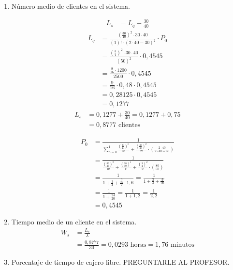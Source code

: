 \documentclass{templateNote}
\begin{document}
\begin{enumerate}
    \item N\'umero medio de clientes en el sistema.
    \newline
    \begin{minipage}[t]{0.45\linewidth}
        \begin{align*}
            L_s &= L_q + \frac{30}{40}
        \end{align*}
        \begin{align*}
            L_q &= \frac{\left(\frac{30}{40}\right)^2 \cdot 30 \cdot 40}{(1)! \cdot (2 \cdot 40 - 30)^2} \cdot P_0 \\
            &= \frac{\left(\frac{3}{4}\right)^2 \cdot 30 \cdot 40}{(50)^2} \cdot 0,4545 \\
            &= \frac{\frac{9}{16} \cdot 1200}{2500} \cdot 0,4545 \\
            &= \frac{9}{16} \cdot 0,48 \cdot 0,4545 \\
            &= 0,28125 \cdot 0,4545 \\
            &= 0,1277
        \end{align*}
        \begin{align*}
            L_s &= 0,1277 + \frac{30}{40} = 0,1277 + 0,75 \\
            &= 0,8777 \text{ clientes}
        \end{align*}

    \end{minipage}
    \hfill
    \begin{minipage}[t]{0.45\textwidth}
        \begin{align*}
            P_0 &= \frac{1}{\displaystyle\sum_{n=0}^{1}{\frac{\left(\frac{30}{40}\right)^n}{n!} + \frac{\left(\frac{30}{40}\right)^2}{2!} \cdot \left(\frac{2 \cdot 40}{2 \cdot 40 - 30}\right)}} \\
            &= \frac{1}{\displaystyle\frac{\left(\frac{30}{40}\right)^0}{0!} + \frac{\left(\frac{30}{40}\right)^1}{1!} + \frac{\left(\frac{3}{4}\right)^2}{2!} \cdot \left(\frac{80}{50}\right)} \\
            &= \frac{1}{1 + \frac{3}{4} + \displaystyle\frac{\frac{9}{16}}{2} \cdot 1,6} = \frac{1}{1 + \frac{3}{4} + \frac{9}{20}} \\
            &= \frac{1}{1 + \frac{24}{20}} = \frac{1}{1 + 1,2} = \frac{1}{2,2} \\
            &= 0,4545
        \end{align*}
    \end{minipage}
    

    \item Tiempo medio de un cliente en el sistema.
    \begin{align*}
        W_s &= \frac{L_s}{\lambda} \\
        &= \frac{0,8777}{30} = 0,0293 \text{ horas} = 1,76 \text{ minutos}
    \end{align*}

    \item Porcentaje de tiempo de cajero libre. \newline
    PREGUNTARLE AL PROFESOR.
\end{enumerate}
\end{document}
